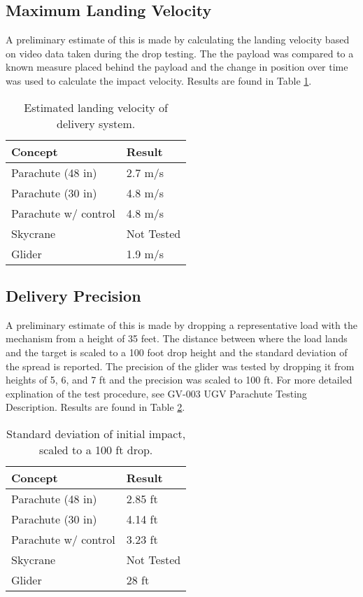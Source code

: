 \documentclass[]{auvsi_doc}
\begin{document}
	\subsection{Maximum Landing Velocity}

	
	A preliminary estimate of this is made by calculating the landing velocity based on video data taken during the drop testing. The the payload was compared to a known measure placed behind the payload and the change in position over time was used to calculate the impact velocity. Results are found in Table \ref{vel}.


	\begin{table}[!h]
	\centering

	\caption{Estimated landing velocity of delivery system.}
	\label{vel}
	\begin{tabular}{|l|l|}
		\hline
		\textbf{Concept}       & \textbf{Result} \\
		\hline
		Parachute (48 in)              &        2.7 m/s         \\
		Parachute (30 in)		&	4.8 m/s\\
		Parachute w/ control   &                4.8 m/s \\
		Skycrane               &                 Not Tested\\
		Glider                 &			1.9 m/s	 \\
		\hline
	\end{tabular}
	\end{table}

	\subsection{Delivery Precision}

	A preliminary estimate of this is made by dropping a representative load with the mechanism from a height of 35 feet. The distance between where the load lands and the target is scaled to a 100 foot drop height and the standard deviation of the spread is reported. The precision of the glider was tested by dropping it from heights of 5, 6, and 7 ft and the precision was scaled to 100 ft. For more detailed explination of the test procedure, see GV-003 UGV Parachute Testing Description. Results are found in Table \ref{precision}.

	\begin{table}[!h]
	\centering

	\caption{Standard deviation of initial impact, scaled to a 100 ft drop.}
	\label{precision}
	\begin{tabular}{|l|l|}
		\hline
		\textbf{Concept}       & \textbf{Result} \\
		\hline
		Parachute (48 in)              &        2.85 ft        \\
		Parachute (30 in)		& 4.14 ft	\\
		Parachute w/ control   &      3.23 ft           \\
		Skycrane               &            Not Tested    \\
		Glider                 &		28 ft		 \\
		\hline
	\end{tabular}
	\end{table}
\end{document}
